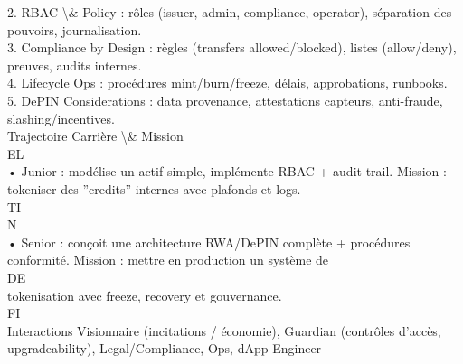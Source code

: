 \vspace{0.5em}
2. RBAC \textbackslash{}& Policy : rôles (issuer, admin, compliance, operator), séparation des pouvoirs, journalisation.\\
\vspace{0.5em}
3. Compliance by Design : règles (transfers allowed/blocked), listes (allow/deny), preuves, audits internes.\\
\vspace{0.5em}
4. Lifecycle Ops : procédures mint/burn/freeze, délais, approbations, runbooks.\\
\vspace{0.5em}
5. DePIN Considerations : data provenance, attestations capteurs, anti-fraude, slashing/incentives.\\
\vspace{0.5em}
Trajectoire Carrière \textbackslash{}& Mission\\
\vspace{0.5em}
\vspace{0.5em}
\vspace{0.5em}
\vspace{0.5em}
EL\\
• Junior : modélise un actif simple, implémente RBAC + audit trail. Mission : tokeniser des ”credits” internes avec plafonds et logs.\\
\vspace{0.5em}
\vspace{0.5em}
\vspace{0.5em}
\vspace{0.5em}
TI\\
N\\
• Senior : conçoit une architecture RWA/DePIN complète + procédures conformité. Mission : mettre en production un système de\\
\vspace{0.5em}
\vspace{0.5em}
\vspace{0.5em}
\vspace{0.5em}
DE\\
tokenisation avec freeze, recovery et gouvernance.\\
\vspace{0.5em}
\vspace{0.5em}
\vspace{0.5em}
\vspace{0.5em}
FI\\
Interactions Visionnaire (incitations / économie), Guardian (contrôles d’accès, upgradeability), Legal/Compliance, Ops, dApp Engineer\\
